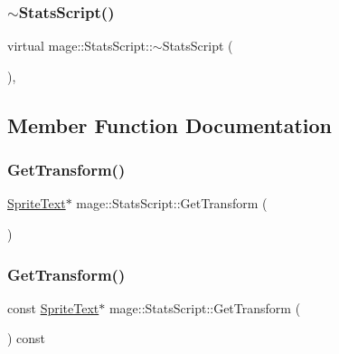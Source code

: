 \hypertarget{classmage_1_1_stats_script_a73fa50aa5591220ba5dfa0d2fe4034ab}{}\label{classmage_1_1_stats_script_a73fa50aa5591220ba5dfa0d2fe4034ab} 
\subsubsection{\texorpdfstring{$\sim$\+Stats\+Script()}{~StatsScript()}}
{\footnotesize\ttfamily virtual mage\+::\+Stats\+Script\+::$\sim$\+Stats\+Script (\begin{DoxyParamCaption}{ }\end{DoxyParamCaption})\hspace{0.3cm}{\ttfamily [virtual]}, {\ttfamily [default]}}



\subsection{Member Function Documentation}
\hypertarget{classmage_1_1_stats_script_ac3fdf01da2b0ace8afd2c52284c34eef}{}\label{classmage_1_1_stats_script_ac3fdf01da2b0ace8afd2c52284c34eef} 
\subsubsection{\texorpdfstring{Get\+Transform()}{GetTransform()}\hspace{0.1cm}{\footnotesize\ttfamily [1/2]}}
{\footnotesize\ttfamily \hyperlink{classmage_1_1_sprite_text}{Sprite\+Text}$\ast$ mage\+::\+Stats\+Script\+::\+Get\+Transform (\begin{DoxyParamCaption}{ }\end{DoxyParamCaption})}

\hypertarget{classmage_1_1_stats_script_a33bbbe0f85058b706848223a6180da3d}{}\label{classmage_1_1_stats_script_a33bbbe0f85058b706848223a6180da3d} 
\subsubsection{\texorpdfstring{Get\+Transform()}{GetTransform()}\hspace{0.1cm}{\footnotesize\ttfamily [2/2]}}
{\footnotesize\ttfamily const \hyperlink{classmage_1_1_sprite_text}{Sprite\+Text}$\ast$ mage\+::\+Stats\+Script\+::\+Get\+Transform (\begin{DoxyParamCaption}{ }\end{DoxyParamCaption}) const}

